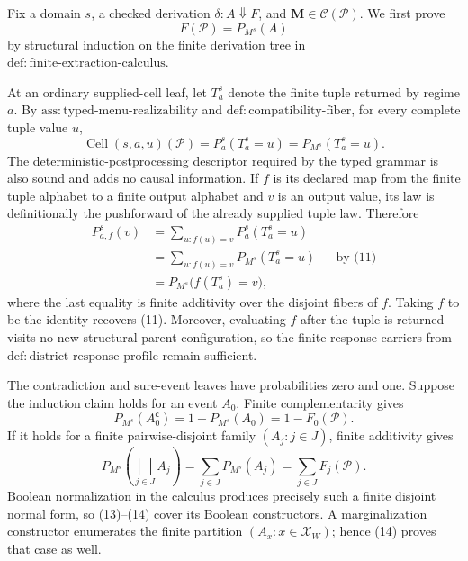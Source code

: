 Fix a domain \(s\), a checked derivation \(\delta:A\Downarrow F\), and \(\mathbf M\in\mathcal C(\mathcal P)\).  We first prove
\[
 F(\mathcal P)=P_{M^s}(A)
\tag{10}
\]
by structural induction on the finite derivation tree in \(\mathrm{def:finite\text{-}extraction\text{-}calculus}\).

At an ordinary supplied-cell leaf, let \(T_a^s\) denote the finite tuple returned by regime \(a\).  By \(\mathrm{ass:typed\text{-}menu\text{-}realizability}\) and \(\mathrm{def:compatibility\text{-}fiber}\), for every complete tuple value \(u\),
\[
 \operatorname{Cell}(s,a,u)(\mathcal P)
 =P_a^s(T_a^s=u)
 =P_{M^s}(T_a^s=u).
\tag{11}
\]
The deterministic-postprocessing descriptor required by the typed grammar is also sound and adds no causal information.  If \(f\) is its declared map from the finite tuple alphabet to a finite output alphabet and \(v\) is an output value, its law is definitionally the pushforward of the already supplied tuple law.  Therefore
\[
 \begin{aligned}
 P_{a,f}^s(v)
 &=\sum_{u:f(u)=v}P_a^s(T_a^s=u)\\
 &=\sum_{u:f(u)=v}P_{M^s}(T_a^s=u) &&\text{by (11)}\\
 &=P_{M^s}\bigl(f(T_a^s)=v\bigr),
 \end{aligned}
\tag{12}
\]
where the last equality is finite additivity over the disjoint fibers of \(f\).  Taking \(f\) to be the identity recovers (11).  Moreover, evaluating \(f\) after the tuple is returned visits no new structural parent configuration, so the finite response carriers from \(\mathrm{def:district\text{-}response\text{-}profile}\) remain sufficient.

The contradiction and sure-event leaves have probabilities zero and one.  Suppose the induction claim holds for an event \(A_0\).  Finite complementarity gives
\[
 P_{M^s}(A_0^{\mathsf c})
 =1-P_{M^s}(A_0)
 =1-F_0(\mathcal P).
\tag{13}
\]
If it holds for a finite pairwise-disjoint family \((A_j:j\in J)\), finite additivity gives
\[
 P_{M^s}\!\left(\bigsqcup_{j\in J}A_j\right)
 =\sum_{j\in J}P_{M^s}(A_j)
 =\sum_{j\in J}F_j(\mathcal P).
\tag{14}
\]
Boolean normalization in the calculus produces precisely such a finite disjoint normal form, so (13)--(14) cover its Boolean constructors.  A marginalization constructor enumerates the finite partition \((A_x:x\in\mathcal X_W)\); hence (14) proves that case as well.

